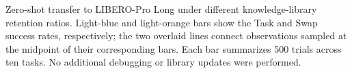 \caption{Zero-shot transfer to LIBERO-Pro Long under different knowledge-library retention ratios. Light-blue and light-orange bars show the Task and Swap success rates, respectively; the two overlaid lines connect observations sampled at the midpoint of their corresponding bars. Each bar summarizes 500 trials across ten tasks. No additional debugging or library updates were performed.}
\label{fig:long_transfer_chart}
